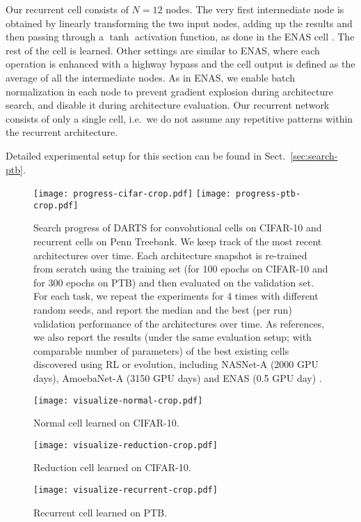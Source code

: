 \documentclass{article}
\begin{document}
Our recurrent cell consists of $N=12$ nodes.
The very first intermediate node is obtained by linearly transforming the two input nodes,
adding up the results and then passing through a $\tanh$ activation function,
as done in the ENAS cell \citep{pham2018efficient}.
The rest of the cell is learned.
Other settings are similar to ENAS,
where each operation is enhanced with a highway bypass \citep{zilly2016recurrent} and the cell output is defined as the average of all the intermediate nodes.
As in ENAS,
we enable batch normalization in each node to prevent gradient explosion during architecture search,
and disable it during architecture evaluation.
Our recurrent network consists of only a single cell, i.e.\ we do not assume any repetitive patterns within the recurrent architecture.

Detailed experimental setup for this section can be found in Sect.~\ref{sec:search-ptb}.

\begin{figure}
	\centering
	\texttt{[image: progress-cifar-crop.pdf]}
	\hfill
	\texttt{[image: progress-ptb-crop.pdf]}
	\caption{Search progress of DARTS for convolutional cells on CIFAR-10 and recurrent cells on Penn Treebank.
	We keep track of the most recent architectures over time. Each architecture snapshot is re-trained from scratch using the training set (for 100 epochs on CIFAR-10 and for 300 epochs on PTB) and then evaluated on the validation set. For each task, we repeat the experiments for 4 times with different random seeds, and report the median and the best (per run) validation performance of the architectures over time. As references, we also report the results (under the same evaluation setup; with comparable number of parameters) of the best existing cells discovered using RL or evolution, including NASNet-A \citep{zoph2017learning} (2000 GPU days), AmoebaNet-A (3150 GPU days) \citep{real2018regularized} and ENAS (0.5 GPU day) \citep{pham2018efficient}.
	}
	\label{fig:progress}
\end{figure}

\begin{figure}[ht]
\hfill
\begin{minipage}[c]{0.5\linewidth}
\centering
\texttt{[image: visualize-normal-crop.pdf]}
\caption{Normal cell learned on CIFAR-10.}
\vspace{1em}
\texttt{[image: visualize-reduction-crop.pdf]}
\caption{Reduction cell learned on CIFAR-10.}
\label{fig:visualization-convolutional}
\end{minipage}
\begin{minipage}[c]{0.48\linewidth}
\centering
\texttt{[image: visualize-recurrent-crop.pdf]}
\caption{Recurrent cell learned on PTB.}
\label{fig:visualization-recurrent}
\end{minipage}
\hfill
\end{figure}
\end{document}
